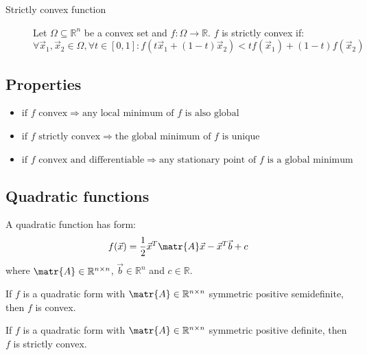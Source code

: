 \begin{description}
    \item[Strictly convex function] 
        Let $\Omega \subseteq \mathbb{R}^n$ be a convex set and $f: \Omega \rightarrow \mathbb{R}$.
        $f$ is strictly convex if:
        \[ 
            \forall \vec{x}_1, \vec{x}_2 \in \Omega, \forall t \in [0, 1]: 
                f(t\vec{x}_1 + (1-t)\vec{x}_2) < t f(\vec{x}_1) + (1-t) f(\vec{x}_2)
        \]
\end{description}


\subsection{Properties}
\begin{itemize}
    \item $\text{if } f \text{ convex} \Rightarrow \text{any local minimum of } f \text{ is also global}$
    \item $\text{if } f \text{ strictly convex} \Rightarrow \text{the global minimum of } f \text{ is unique}$
    \item $\text{if } f \text{ convex and differentiable} \Rightarrow \text{any stationary point of } f \text{ is a global minimum}$
\end{itemize}


\subsection{Quadratic functions}
A quadratic function has form:
\[ f(\vec{x}) = \frac{1}{2}\vec{x}^T\matr{A}\vec{x} - \vec{x}^T\vec{b} + c \]
where $\matr{A} \in \mathbb{R}^{n \times n}$, $\vec{b} \in \mathbb{R}^n$ and $c \in \mathbb{R}$.

\begin{theorem}
    If $f$ is a quadratic form with $\matr{A} \in \mathbb{R}^{n \times n}$ symmetric positive semidefinite,
    then $f$ is convex.
\end{theorem}

\begin{theorem}
    If $f$ is a quadratic form with $\matr{A} \in \mathbb{R}^{n \times n}$ symmetric positive definite,
    then $f$ is strictly convex.
\end{theorem}

